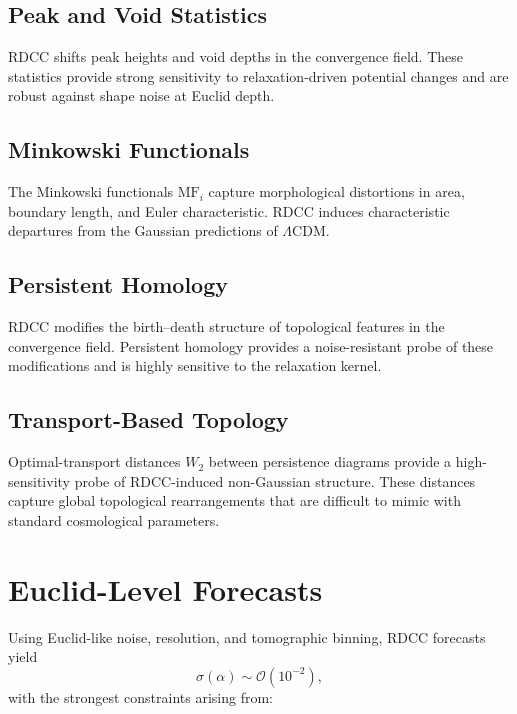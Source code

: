 \documentclass[11pt,a4paper]{article}
\begin{document}
\subsection{Peak and Void Statistics}

RDCC shifts peak heights and void depths in the convergence field. These
statistics provide strong sensitivity to relaxation-driven potential changes and
are robust against shape noise at Euclid depth.

\subsection{Minkowski Functionals}

The Minkowski functionals $\mathrm{MF}_{i}$ capture morphological distortions in
area, boundary length, and Euler characteristic. RDCC induces characteristic
departures from the Gaussian predictions of $\Lambda$CDM.

\subsection{Persistent Homology}

RDCC modifies the birth–death structure of topological features in the
convergence field. Persistent homology provides a noise-resistant probe of these
modifications and is highly sensitive to the relaxation kernel.

\subsection{Transport-Based Topology}

Optimal-transport distances $W_{2}$ between persistence diagrams provide a
high-sensitivity probe of RDCC-induced non-Gaussian structure. These distances
capture global topological rearrangements that are difficult to mimic with
standard cosmological parameters.


\section{Euclid-Level Forecasts}

Using Euclid-like noise, resolution, and tomographic binning, RDCC forecasts
yield
\begin{equation}
    \sigma(\alpha) \sim \mathcal{O}(10^{-2}),
\end{equation}
with the strongest constraints arising from:
\end{document}

